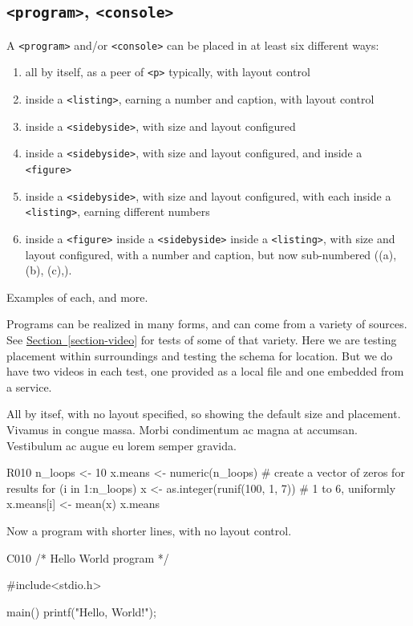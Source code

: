 \documentclass{amsart}
\theoremstyle{plain}%
\theoremstyle{definition}%
\theoremstyle{remark}%
\newcommand{\xreffont}{\relax}
\newcommand{\mono}[1]{\texttt{#1}}
\numberwithin{equation}{section}
\begin{document}
\subsection{\mono{<program>}, \mono{<console>}}\label{atomic-program}%
A \mono{<program>} and\slash{}or \mono{<console>} can be placed in at least six  different ways:%
\begin{enumerate}
\item{}all by itself, as a peer of \mono{<p>} typically, with layout control%
\item{}inside a \mono{<listing>}, earning a number and caption, with layout control%
\item{}inside a \mono{<sidebyside>}, with size and layout configured%
\item{}inside a \mono{<sidebyside>}, with size and layout configured, and inside a \mono{<figure>}%
\item{}inside a \mono{<sidebyside>}, with size and layout configured, with each inside a \mono{<listing>}, earning different numbers%
\item{}inside a \mono{<figure>} inside a \mono{<sidebyside>} inside a \mono{<listing>}, with size and layout configured, with a number and caption, but now sub-numbered ((a), (b), (c),\textellipsis{}).%
\end{enumerate}
Examples of each, and more.%
\par
Programs can be realized in many forms, and can come from a variety of sources.  See \hyperref[section-video]{Section~{\xreffont\ref{section-video}}} for tests of some of that variety.  Here we are testing placement within surroundings and testing the schema for location.  But we do have two videos in each test, one provided as a local file and one embedded from a service.%
\par
All by itsef, with no layout specified, so showing the default size and placement.  Vivamus in congue massa. Morbi condimentum ac magna at accumsan. Vestibulum ac augue eu lorem semper gravida.%
\begin{program}{R}{0}{1}{0}
n_loops <- 10
x.means <- numeric(n_loops)  # create a vector of zeros for results
for (i in 1:n_loops){
    x <- as.integer(runif(100, 1, 7))  # 1 to 6, uniformly
    x.means[i] <- mean(x)
}
x.means
\end{program}
Now a program with shorter lines, with no layout control.%
\begin{program}{C}{0}{1}{0}
/* Hello World program */

#include<stdio.h>

main()
{
    printf("Hello, World!");
}
\end{program}
\end{document}
